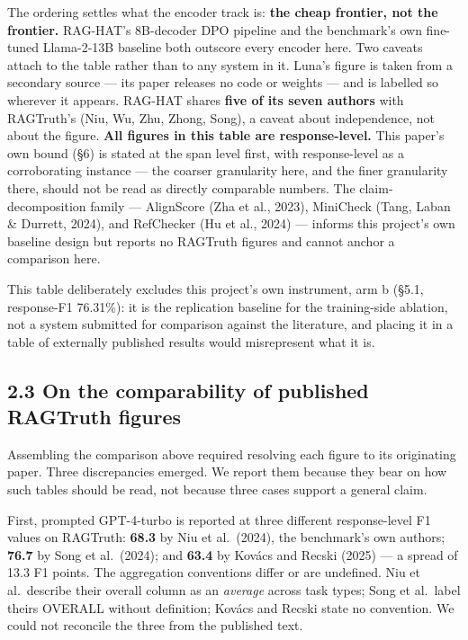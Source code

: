 \documentclass[11pt]{article}
\begin{document}
The ordering settles what the encoder track is: \textbf{the cheap frontier, not the frontier.}
RAG-HAT's 8B-decoder DPO pipeline and the benchmark's own fine-tuned Llama-2-13B baseline
both outscore every encoder here. Two caveats attach to the table rather than to any system
in it. Luna's figure is taken from a secondary source --- its paper releases no code or
weights --- and is labelled so wherever it appears. RAG-HAT shares \textbf{five of its seven
authors} with RAGTruth's (Niu, Wu, Zhu, Zhong, Song), a caveat about independence, not
about the figure. \textbf{All figures in this table are response-level.} This paper's own bound
(§6) is stated at the span level first, with response-level as a corroborating instance ---
the coarser granularity here, and the finer granularity there, should not be read as
directly comparable numbers. The claim-decomposition family --- AlignScore (Zha et al.,
2023), MiniCheck (Tang, Laban \& Durrett, 2024), and RefChecker (Hu et al., 2024) --- informs
this project's own baseline design but reports no RAGTruth figures and cannot anchor a
comparison here.

This table deliberately excludes this project's own instrument, arm b (§5.1,
response-F1 76.31\%): it is the replication baseline for the training-side ablation, not a
system submitted for comparison against the literature, and placing it in a table of
externally published results would misrepresent what it is.

\subsection{2.3 On the comparability of published RAGTruth figures}\label{on-the-comparability-of-published-ragtruth-figures}

Assembling the comparison above required resolving each figure to its originating paper.
Three discrepancies emerged. We report them because they bear on how such tables should be
read, not because three cases support a general claim.

First, prompted GPT-4-turbo is reported at three different response-level F1 values on
RAGTruth: \textbf{68.3} by Niu et al.~(2024), the benchmark's own authors; \textbf{76.7} by Song et
al.~(2024); and \textbf{63.4} by Kovács and Recski (2025) --- a spread of 13.3 F1 points. The
aggregation conventions differ or are undefined. Niu et al.~describe their overall column
as an \emph{average} across task types; Song et al.~label theirs OVERALL without definition;
Kovács and Recski state no convention. We could not reconcile the three from the published
text.
\end{document}
